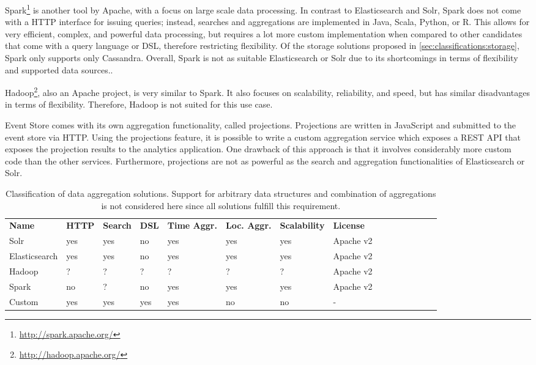 
Spark\footnote{\url{http://spark.apache.org/}} is another tool by Apache, with a focus on large scale data processing.
In contrast to Elasticsearch and Solr, Spark does not come with a HTTP interface for issuing queries; instead, searches and aggregations are implemented in Java, Scala, Python, or R.
This allows for very efficient, complex, and powerful data processing, but requires a lot more custom implementation when compared to other candidates that come with a query language or \ac{DSL}, therefore restricting flexibility.
Of the storage solutions proposed in \cref{sec:classifications:storage}, Spark only supports only Cassandra.
Overall, Spark is not as suitable Elasticsearch or Solr due to its shortcomings in terms of flexibility and supported data sources..

Hadoop\footnote{\url{http://hadoop.apache.org/}}, also an Apache project, is very similar to Spark.
It also focuses on scalability, reliability, and speed, but has similar disadvantages in terms of flexibility.
Therefore, Hadoop is not suited for this use case.

Event Store comes with its own aggregation functionality, called projections.
Projections are written in JavaScript and submitted to the event store via HTTP.
Using the projections feature, it is possible to write a custom aggregation service which exposes a \ac{REST} API that exposes the projection results to the analytics application.
One drawback of this approach is that it involves considerably more custom code than the other services.
Furthermore, projections are not as powerful as the search and aggregation functionalities of Elasticsearch or Solr.

\begin{table}[]
\centering
\caption{Classification of data aggregation solutions. Support for arbitrary data structures and combination of aggregations is not considered here since all solutions fulfill this requirement.}
\begin{tabular}{lllllllllllllll}
\textbf{Name} & \textbf{HTTP} & \textbf{Search} & \textbf{DSL} & \textbf{Time Aggr.} & \textbf{Loc. Aggr.} & \textbf{Scalability} & \textbf{License} \\
Solr & yes & yes & no & yes & yes & yes & Apache v2 \\
Elasticsearch & yes & yes & no & yes & yes & yes & Apache v2 \\
Hadoop & ? & ? & ? & ? & ? & ? & Apache v2 \\
Spark & no & ? & no & yes & yes & yes & Apache v2 \\
Custom & yes & yes & yes & yes & no & no & -
\end{tabular}
\label{table:classifications:aggregation}
\end{table}

